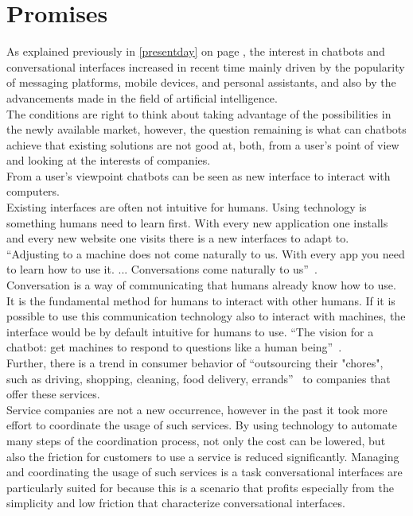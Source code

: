 \section{Promises}


As explained previously in \ref{presentday} on page \pageref{presentday}, the interest in chatbots and conversational interfaces increased in recent time mainly driven by the popularity of messaging platforms, mobile devices, and personal assistants, and also by the advancements made in the field of artificial intelligence.
\\
The conditions are right to think about taking advantage of the possibilities in the newly available market, however, the question remaining is what can chatbots achieve that existing solutions are not good at, both, from a user's point of view and looking at the interests of companies.
\\

From a user's viewpoint chatbots can be seen as new interface to interact with computers.
\\
Existing interfaces are often not intuitive for humans.
Using technology is something humans need to learn first.
With every new application one installs and every new website one visits there is a new interfaces to adapt to.
\\
``Adjusting to a machine does not come naturally to us. With every app you need to learn how to use it. ... Conversations come naturally to us''~\cite{techinasia}.
\\
Conversation is a way of communicating that humans already know how to use.
It is the fundamental method for humans to interact with other humans.
If it is possible to use this communication technology also to interact with machines, the interface would be by default intuitive for humans to use.
``The vision for a chatbot: get machines to respond to questions like a human being''~\cite{techinasia}.
\\

Further, there is a trend in consumer behavior of ``outsourcing their "chores", such as driving, shopping, cleaning, food delivery, errands''~\cite{chatbotbook} to companies that offer these services.
\\
Service companies are not a new occurrence, however in the past it took more effort to coordinate the usage of such services.
By using technology to automate many steps of the coordination process, not only the cost can be lowered,
but also the friction for customers to use a service is reduced significantly.
Managing and coordinating the usage of such services is a task conversational interfaces are particularly suited for because this is a scenario that profits especially from the simplicity and low friction that characterize conversational interfaces.
\\


